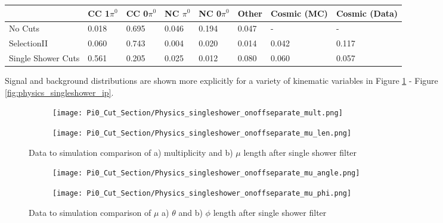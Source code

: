 \begin{table}[H]
\centering
{}
 \begin{tabular}{| l | l | l |l|l|l|l|l|}
 \hline
  & CC 1$\pi^0$ & CC 0$\pi^0$ & NC $\pi^0$ & NC 0$\pi^0$ & Other& Cosmic (MC) & Cosmic (Data) \\ [0.1ex] \hline
No Cuts  & 0.018 &  0.695 & 0.046 & 0.194  & 0.047 & -&-\\
SelectionII & 0.060 & 0.743 & 0.004 & 0.020 & 0.014 & 0.042 & 0.117  \\ 
Single Shower Cuts & 0.561 & 0.205 & 0.025 & 0.012 & 0.080 & 0.060 & 0.057 \\ \hline
\end{tabular}
\end{table}

Signal and background distributions are shown more explicitly for a variety of kinematic variables in Figure \ref{fig:physics_singleshower_mulen} - Figure \ref{fig:physics_singleshower_ip}.

\begin{figure}[H]
\centering
  \begin{subfigure}[t]{0.3\textwidth}
    \centering
\texttt{[image: Pi0\_Cut\_Section/Physics\_singleshower\_onoffseparate\_mult.png]}
  \caption{ }
  \end{subfigure} 
  \hspace{20mm}
  \begin{subfigure}[t]{0.3\textwidth}
    \centering
\texttt{[image: Pi0\_Cut\_Section/Physics\_singleshower\_onoffseparate\_mu\_len.png]}
  \caption{ }
  \end{subfigure} 

\caption{ Data to simulation comparison of a) multiplicity and b) $\mu$ length after single shower filter }
\label{fig:physics_singleshower_mulen}
\end{figure}

\begin{figure}[H]
\centering
  \begin{subfigure}[t]{0.3\textwidth}
    \centering
\texttt{[image: Pi0\_Cut\_Section/Physics\_singleshower\_onoffseparate\_mu\_angle.png]}
  \caption{ }
  \end{subfigure} 
  \hspace{20mm}
  \begin{subfigure}[t]{0.3\textwidth}
    \centering
\texttt{[image: Pi0\_Cut\_Section/Physics\_singleshower\_onoffseparate\_mu\_phi.png]}
  \caption{ }
  \end{subfigure} 
\caption{ Data to simulation comparison of $\mu$ a) $\theta$ and b) $\phi$ length after single shower filter }
\label{fig:physics_singleshower_muphi}
\end{figure}

